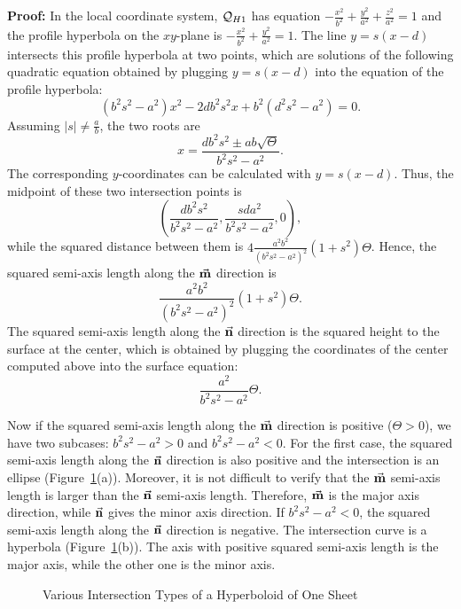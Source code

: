 {\bf Proof:}  In the local coordinate system, ${\cal Q}_{H1}$ has equation
$-\frac{x^2}{b^2}+\frac{y^2}{a^2}+\frac{z^2}{a^2}=1$ and the profile hyperbola
on the $xy$-plane is $-\frac{x^2}{b^2}+\frac{y^2}{a^2}=1$.
The line $y=s(x-d)$ intersects this
profile hyperbola at two points, which are solutions of the following
quadratic equation obtained by plugging $y=s(x-d)$ into
the equation of the profile hyperbola:
\begin{equation}
\label{eqn:hy1-2degree}
     (b^2s^2-a^2)x^2-2db^2s^2x+b^2(d^2s^2-a^2)=0.
\end{equation}
Assuming $|s|\neq\frac{a}{b}$, the two roots are
\begin{equation}
\label{eqn:hy1-roots}
     x = \frac{db^2s^2\pm ab\sqrt{\Theta}}{b^2s^2-a^2}.
\end{equation}
The corresponding $y$-coordinates can be calculated with $y=s(x-d)$.  Thus,
the midpoint of these two intersection points is
\[ \left(\frac{db^2s^2}{b^2s^2-a^2},\frac{sda^2}{b^2s^2-a^2},0\right), \]
while the squared distance between them is
$4\frac{a^2b^2}{(b^2s^2-a^2)^2}(1+s^2)\Theta$.  Hence, the squared semi-axis
length along the $\vec{\bf m}$ direction is
\begin{equation}
\label{eqn:hy1-m-length}
     \frac{a^2b^2}{(b^2s^2-a^2)^2}(1+s^2)\Theta.
\end{equation}
The squared semi-axis length along the $\vec{\bf n}$ direction is the squared
height to the surface at the center, which is obtained by
plugging the coordinates of
the center computed above into the surface equation:
\begin{equation}
\label{eqn:hy1-n-length}
     \frac{a^2}{b^2s^2-a^2}\Theta.
\end{equation}

     Now if the squared semi-axis length along the $\vec{\bf m}$ direction is
positive ($\Theta>0$), we have two subcases:  $b^2s^2-a^2>0$ and
$b^2s^2-a^2<0$.  For the first case, the squared semi-axis length along the
$\vec{\bf n}$ direction is also positive and the intersection is an
ellipse (Figure~\ref{fig:hy1-intersections}(a)).  Moreover, it is not difficult
to verify that the $\vec{\bf m}$ semi-axis length is larger than the $\vec{\bf n}$
semi-axis length.  Therefore, $\vec{\bf m}$ is the major axis direction, while
$\vec{\bf n}$ gives the minor axis direction.
If $b^2s^2-a^2<0$, the squared semi-axis length
along the $\vec{\bf n}$ direction is negative.
The intersection curve is a hyperbola
(Figure~\ref{fig:hy1-intersections}(b)).
The axis with positive squared semi-axis length is the major axis,
while the other one is the minor axis.
\begin{figure}
\vspace{9.5cm}
\caption{Various Intersection Types of a Hyperboloid of One Sheet}
\label{fig:hy1-intersections}
\end{figure}

